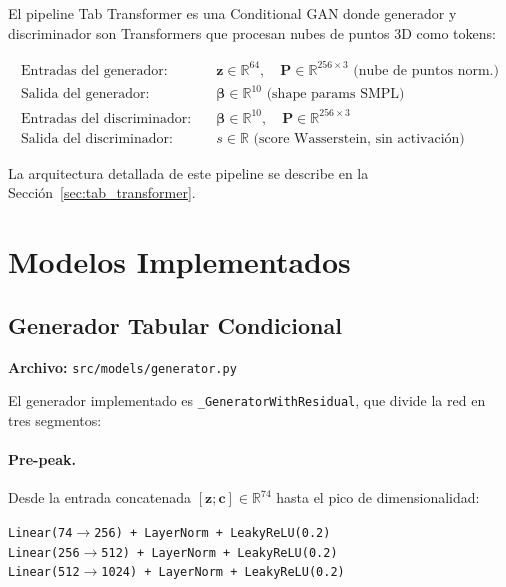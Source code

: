 \documentclass[a4paper,11pt]{article}
\begin{document}
El pipeline Tab Transformer es una Conditional GAN donde generador y
discriminador son Transformers que procesan nubes de puntos 3D como tokens:

\begin{align*}
    \text{Entradas del generador:}\quad   & \bm{z}\in\mathbb{R}^{64},\quad
                                             \bm{P}\in\mathbb{R}^{256\times3} \text{ (nube de puntos norm.)} \\
    \text{Salida del generador:}\quad      & \bm{\beta}\in\mathbb{R}^{10} \text{ (shape params SMPL)} \\
    \text{Entradas del discriminador:}\quad & \bm{\beta}\in\mathbb{R}^{10},\quad
                                              \bm{P}\in\mathbb{R}^{256\times3} \\
    \text{Salida del discriminador:}\quad  & s\in\mathbb{R} \text{ (score Wasserstein, sin activación)}
\end{align*}

La arquitectura detallada de este pipeline se describe en la
Sección~\ref{sec:tab_transformer}.

\section{Modelos Implementados}

\subsection{Generador Tabular Condicional}

\textbf{Archivo:} \texttt{src/models/generator.py}

El generador implementado es \texttt{\_GeneratorWithResidual}, que divide
la red en tres segmentos:

\paragraph{Pre-peak.} Desde la entrada concatenada
$[\bm{z};\bm{c}]\in\mathbb{R}^{74}$ hasta el pico de dimensionalidad:

\begin{center}
\texttt{Linear(74$\to$256) + LayerNorm + LeakyReLU(0.2)} \\
\texttt{Linear(256$\to$512) + LayerNorm + LeakyReLU(0.2)} \\
\texttt{Linear(512$\to$1024) + LayerNorm + LeakyReLU(0.2)}
\end{center}
\end{document}
